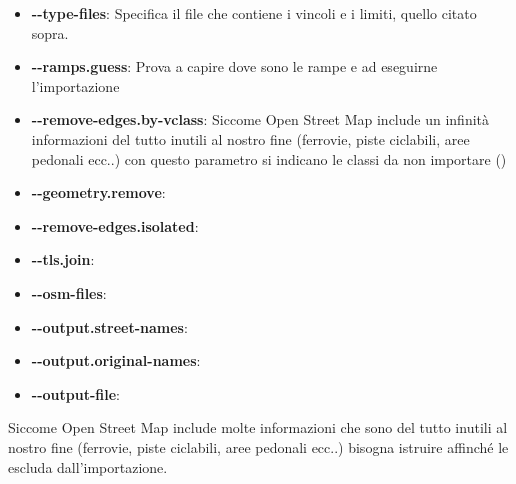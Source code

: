 \begin{itemize}
	\item \textbf{-{}-type-files}: Specifica il file che contiene i vincoli e i limiti, quello citato sopra.
	\item \textbf{-{}-ramps.guess}: Prova a capire dove sono le rampe e ad eseguirne l'importazione
	\item \textbf{-{}-remove-edges.by-vclass}: Siccome Open Street Map include un infinità informazioni del tutto inutili al nostro fine (ferrovie, piste ciclabili, aree pedonali ecc..) con questo parametro si indicano le classi da non importare ()
	\item \textbf{-{}-geometry.remove}:
	\item \textbf{-{}-remove-edges.isolated}:
	\item \textbf{-{}-tls.join}:
	\item \textbf{-{}-osm-files}:
	\item \textbf{-{}-output.street-names}:
	\item \textbf{-{}-output.original-names}:
	\item \textbf{-{}-output-file}:
\end{itemize}

Siccome Open Street Map include molte informazioni che sono del tutto inutili al nostro fine (ferrovie, piste ciclabili, aree pedonali ecc..) bisogna istruire  affinché le escluda dall'importazione. 


